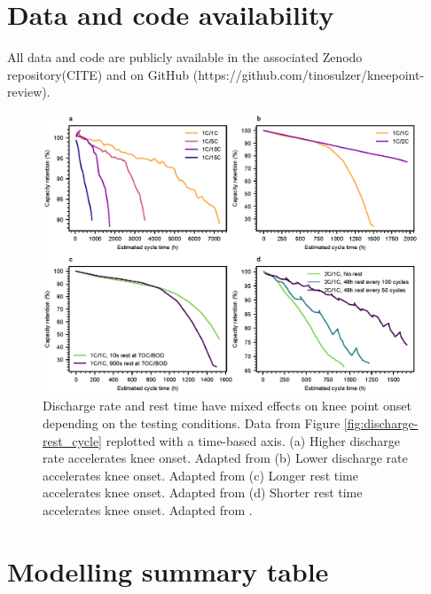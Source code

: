 \documentclass[journal=jpclcd,manuscript=article]{achemso}
\begin{document}
\section{Data and code availability}

All data and code are publicly available in the associated Zenodo repository(CITE) and on GitHub (https://github.com/tinosulzer/kneepoint-review).

\newpage

\begin{figure}[ht]
\centering
\includegraphics[scale = 1.0]{figures/discharge_rate_rest_time.eps}
\caption{Discharge rate and rest time have mixed effects on knee point onset depending on the testing conditions. Data from Figure \ref{fig:discharge-rest_cycle} replotted with a time-based axis. (a) Higher discharge rate accelerates knee onset. Adapted from \cite{omar_lithium_2014} (b) Lower discharge rate accelerates knee onset. Adapted from \cite{keil_linear_2019} (c) Longer rest time accelerates knee onset. Adapted from \cite{keil_linear_2019} (d) Shorter rest time accelerates knee onset. Adapted from \cite{epding_investigation_2019}.}
\label{fig:discharge-rest_time}
\end{figure}

\newpage
% 


\appendix

\section{Modelling summary table}
\end{document}
